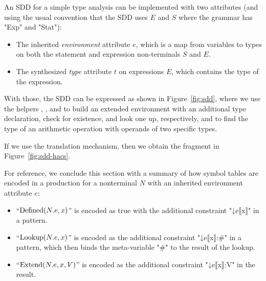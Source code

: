 \documentclass[11pt]{article} %
\begin{document}
\begin{example}\label{ex:sdd}
  An SDD for a simple type analysis can be implemented with two attributes (and using the usual
  convention that the SDD uses $E$ and $S$ where the \HAX grammar has "Exp" and "Stat"):
  \begin{itemize}

  \item The inherited \emph{environment} attribute $e$, which is a map from variables to types on
    both the statement and expression non-terminals $S$ and $E$.

  \item The synthesized \emph{type} attribute $t$ on expressions $E$, which contains the type of the
    expression.

  \end{itemize}
  With those, the SDD can be expressed as shown in Figure~\ref{fig:sdd}, where we use the helpers
  , , and  to build an extended environment with an additional
  type declaration, check for existence, and look one up, respectively, and  to find the
  type of an arithmetic operation with operands of two specific types.

  If we use the translation mechanism, then we obtain the \HAX fragment in
  Figure~\ref{fig:sdd-hacs}.
\end{example}

For reference, we conclude this section with a summary of how symbol tables are encoded in a
production for a nonterminal $N$ with an inherited environment attribute $e$:
\begin{itemize}

\item ``$\operatorname{Defined}(N.e, x)$'' is encoded as true with the additional constraint "↓e{⟦x⟧}"
  in a pattern.

\item ``$\operatorname{Lookup}(N.e, x)$'' is encoded as the additional constraint "↓e{⟦x⟧:#}" in a pattern,
  which then binds the meta-variable "#" to the result of the lookup.

\item ``$\operatorname{Extend}(N.e, x, V)$'' is encoded as the additional constraint "↓e{⟦x⟧:V}" in the
  result.

\end{itemize}
\end{document}
